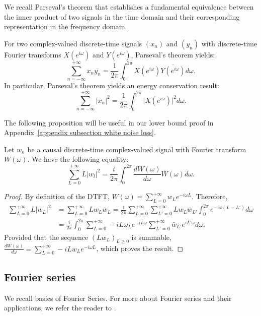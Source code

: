 We recall Parseval's theorem that establishes a fundamental equivalence between the inner product of two signals in the time domain and their corresponding representation in the frequency domain.

\begin{theorem}[Parseval]
    For two complex-valued discrete-time signals \((x_n)\) and \((y_n)\) with discrete-time Fourier transforms \(X(e^{i\omega})\) and \(Y(e^{i\omega})\), Parseval's theorem yields:
    \begin{equation}
        \sum_{n=-\infty}^{+\infty}x_n\overline{y_n} = \frac{1}{2\pi}\int_0^{2\pi}X(e^{i\omega})\overline{Y(e^{i\omega})}d\omega.
        \label{Parseval thm}
    \end{equation}
In particular, Parseval's theorem yields an energy conservation result:
    $$
        \sum_{n=-\infty}^{+\infty}\vert x_n\vert^2 = \frac{1}{2\pi}\int_0^{2\pi}\vert X(e^{i\omega})\vert^2 d\omega.
    $$
\end{theorem}
The following proposition will be useful in our lower bound proof in Appendix~\ref{appendix subsection white noise loss}.
\begin{proposition}\label{proposition semi parseval}
    Let $w_n$ be a causal discrete-time complex-valued signal with Fourier transform $W(\omega)$. We have the following equality:
    \[
    \sum_{L=0}^{+\infty}L\vert w_l\vert^2 = \frac{i}{2\pi}\int_0^{2\pi}\frac{dW(\omega)}{d\omega}\overline{W}(\omega)d\omega.
    \]
\end{proposition}

\begin{proof}
    By definition of the DTFT, $W(\omega) = \sum_{L=0}^{+\infty}w_Le^{-i\omega L}$. Therefore, 
    \begin{align*}
        \sum_{L=0}^{+\infty}L\vert w_L\vert^2 &= \sum_{L=0}^{+\infty}Lw_L\bar{w}_L = \frac{1}{2\pi}\sum_{L=0}^{+\infty}\sum_{L'=0}^{+\infty}Lw_L\bar{w}_{L'}\int_0^{2\pi}e^{-i\omega(L-L')}d\omega\\
        &= \frac{i}{2\pi}\int_0^{2\pi}\sum_{L=0}^{+\infty}-iL\omega_Le^{-iL\omega}\sum_{L'=0}^{+\infty}\bar{w}_{L'}e^{iL'\omega}d\omega.
    \end{align*}
    Provided that the sequence $(Lw_L)_{L\geq 0}$ is summable, $\frac{dW(\omega)}{d\omega}=\sum_{L=0}^{+\infty}-iLw_Le^{-i\omega L}$, which proves the result.
\end{proof}

\subsection{Fourier series}\label{appendix subsection Fourier series}
We recall basics of Fourier Series. For more about Fourier series and their applications, we refer the reader to \cite{serov2017fourier}.

